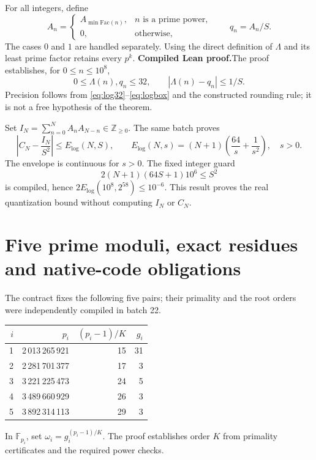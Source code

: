 \documentclass[11pt,a4paper]{article}
\theoremstyle{remark}
\newcommand{\Lam}{\Lambda}
\newcommand{\Z}{\mathbb Z}
\newcommand{\paid}{\textbf{Compiled Lean proof.}\space}
\begin{document}
For all integers, define
\[
A_n=\begin{cases}
A_{\min\mathrm{Fac}(n)},& n\text{ is a prime power},\\
0,&\text{otherwise},
\end{cases}\qquad q_n=A_n/S.
\]
The cases $0$ and $1$ are handled separately. Using the direct definition
of $\Lam$ and its least prime factor retains every $p^k$.
\paid The proof establishes, for $0\le n\le10^8$,
\begin{equation}\label{eq:q-error}
0\le\Lam(n),q_n\le32,\qquad |\Lam(n)-q_n|\le 1/S.
\end{equation}
Precision follows from \eqref{eq:log32}--\eqref{eq:logbox} and the constructed
rounding rule; it is not a free hypothesis of the theorem.

Set $I_N=\sum_{n=0}^{N}A_nA_{N-n}\in\Z_{\ge0}$. The same batch proves
\begin{equation}\label{eq:E-log}
\left|C_N-\frac{I_N}{S^2}\right|\le E_{\log}(N,S),\qquad
E_{\log}(N,s)=(N+1)\left(\frac{64}{s}+\frac1{s^2}\right),\quad s>0.
\end{equation}
The envelope is continuous for $s>0$. The fixed integer guard
\begin{equation}\label{eq:q-guard}
2(N+1)(64S+1)10^6\le S^2
\end{equation}
is compiled, hence $2E_{\log}(10^8,2^{58})\le10^{-6}$. This result proves
the real quantization bound without computing $I_N$ or $C_N$.

\clearpage
\section{Five prime moduli, exact residues and native-code obligations}\label{sec:crt}
The contract fixes the following five pairs; their primality and the root
orders were independently compiled in batch 22.
\begin{center}
\begin{tabular}{@{}rrrr@{}}
\toprule
$i$ & $p_i$ & $(p_i-1)/K$ & $g_i$\\
\midrule
1 & 2\,013\,265\,921 & 15 & 31\\
2 & 2\,281\,701\,377 & 17 & 3\\
3 & 3\,221\,225\,473 & 24 & 5\\
4 & 3\,489\,660\,929 & 26 & 3\\
5 & 3\,892\,314\,113 & 29 & 3\\
\bottomrule
\end{tabular}
\end{center}
In $\mathbb F_{p_i}$, set $\omega_i=g_i^{(p_i-1)/K}$. The proof establishes
order $K$ from primality certificates and the required power checks.
\end{document}
